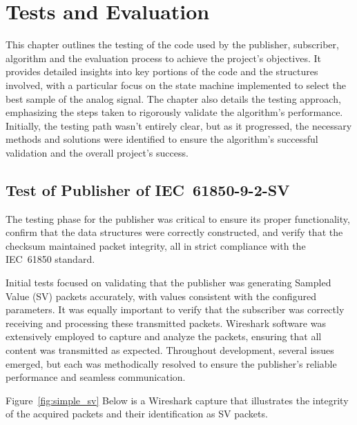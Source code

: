 
\chapter{Tests and Evaluation} %

\label{chap:Chapter6} %

This chapter outlines the testing of the code used by the publisher, subscriber, algorithm and the evaluation process to achieve the project’s objectives. It provides detailed insights into key portions of the code and the structures involved, with a particular focus on the state machine implemented to select the best sample of the analog signal. The chapter also details the testing approach, emphasizing the steps taken to rigorously validate the algorithm's performance. Initially, the testing path wasn't entirely clear, but as it progressed, the necessary methods and solutions were identified to ensure the algorithm's successful validation and the overall project's success.

\section{Test of Publisher of IEC~61850-9-2-SV}

The testing phase for the publisher was critical to ensure its proper functionality, confirm that the data structures were correctly constructed, and verify that the checksum maintained packet integrity, all in strict compliance with the IEC~61850 standard.

Initial tests focused on validating that the publisher was generating Sampled Value (SV) packets accurately, with values consistent with the configured parameters. It was equally important to verify that the subscriber was correctly receiving and processing these transmitted packets. Wireshark software was extensively employed to capture and analyze the packets, ensuring that all content was transmitted as expected. Throughout development, several issues emerged, but each was methodically resolved to ensure the publisher's reliable performance and seamless communication.

Figure~\ref{fig:simple_sv} Below is a Wireshark capture that illustrates the integrity of the acquired packets and their identification as SV packets.

